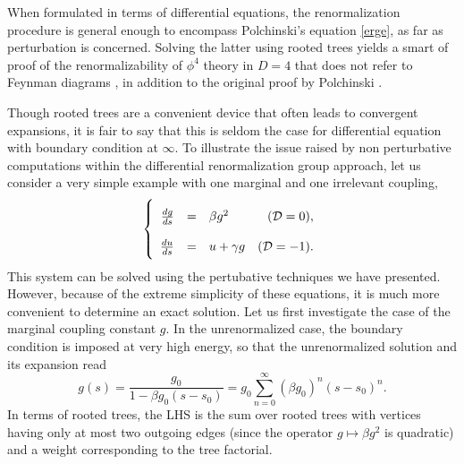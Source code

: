 \documentclass[10pt,here,feynmf]{article}
\begin{document}
When formulated in terms of differential equations, the renormalization procedure is general enough to encompass Polchinski's equation \eqref{erge}, as far as perturbation is concerned. Solving the latter using rooted trees yields a smart of proof of the renormalizability of $\phi^{4}$ theory in $D=4$ that does not refer to Feynman diagrams \cite{Hurd}, in addition to the original proof by Polchinski \cite{Polchinski}.

Though rooted trees are a convenient device that often leads to convergent expansions, it is fair to say that this is seldom the case for differential equation with boundary condition at $\infty$.  To illustrate the issue raised by non perturbative computations within the differential renormalization group approach, let us consider a very simple example with one marginal and one irrelevant coupling,
\begin{equation}
\renewcommand{\baselinestretch}{3}
\left\{
\begin{array}{rclr}
\renewcommand{\baselinestretch}{3}
\frac{dg}{ds}&=&\beta g^{2}&({\cal D}=0),\cr \frac{du}{ds}&=&u+\gamma
g&({\cal D}=-1).\label{toybeta}
\end{array}
\right.
\end{equation}
\renewcommand{\baselinestretch}{2}
This system can be solved using the pertubative techniques we have presented. However, because of the extreme simplicity of these equations, it is much more convenient to determine an exact solution. Let us first investigate the case of the marginal coupling constant $g$. In the unrenormalized case, the boundary condition is imposed at very high energy, so that the unrenormalized solution and its expansion read
 \begin{equation}
g(s)=\frac{g_{0}}{1-\beta g_{0}(s-s_{0})}=g_{0}\sum_{n=0}^{\infty}(\beta g_{0})^{n}(s-s_{0})^{n}.
\label{bareg}
 \end{equation}
In terms of rooted trees, the LHS is the sum over rooted trees with vertices having only at most two   outgoing edges (since the operator $g\mapsto\beta g^{2}$ is quadratic) and a weight corresponding to the tree factorial.
\end{document}
